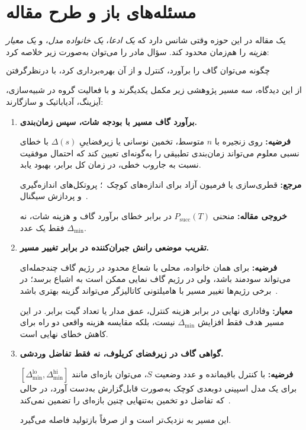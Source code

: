 \section{مسئله‌های باز و طرح مقاله}
\label{sec:gap-paper-tracks}

یک مقاله در این حوزه وقتی شانس دارد که \emph{یک ادعا}، \emph{یک خانواده مدل}، و \emph{یک معیار هزینه} را هم‌زمان محدود کند.
سؤال مادر را می‌توان به‌صورت زیر خلاصه کرد:

\begin{equation}
	\boxed{
		\text{چگونه می‌توان گاف را برآورد، کنترل و از آن بهره‌برداری کرد،
			با درنظرگرفتن محدودیت منابع کوانتومی؟}
	}
\end{equation}

از این دیدگاه، سه مسیر پژوهشی زیر مکمل یکدیگرند و با فعالیت گروه در شبیه‌سازی، آیزینگ، آدیاباتیک و  سازگارند:

\begin{enumerate}
	\item \textbf{برآورد گاف مسیر با بودجه شات، سپس زمان‌بندی.}
	
	\textbf{فرضیه:}
	روی زنجیره  با $n$ متوسط، تخمین نوسانی یا زیرفضا‌ییِ $\Delta(s)$ با خطای نسبی معلوم می‌تواند زمان‌بندی تطبیقی را به‌گونه‌ای تعیین کند که احتمال موفقیت نسبت به جاروب خطی، در زمان کل برابر، بهبود یابد.
	
	\textbf{مرجع:}
	قطری‌سازی یا فرمیون آزاد برای اندازه‌های کوچک~\cite{GapPfeuty1970}؛ پروتکل‌های اندازه‌گیری و پردازش سیگنال~\cite{GapLee2025,GapCugini2025}.
	
	\textbf{خروجی مقاله:}
	منحنی $P_{\mathrm{succ}}(T)$ در برابر خطای برآورد گاف و هزینه شات، نه فقط یک عدد $\Delta_{\min}$.
	
	\item \textbf{تقریب موضعی رانش جبران‌کننده در برابر تغییر مسیر.}
	
	\textbf{فرضیه:}
	برای همان خانواده،  محلی با شعاع محدود در رژیم گاف چندجمله‌ای می‌تواند سودمند باشد، ولی در رژیم گاف نمایی ممکن است به اشباع برسد؛ در برخی رژیم‌ها تغییر مسیر با هامیلتونی کاتالیزگر می‌تواند گزینه بهتری باشد~\cite{GapSels2017,Gueneau2025CD}.
	
	\textbf{معیار:}
	وفاداری نهایی در برابر هزینه کنترل، عمق مدار یا تعداد گیت برابر.
	در این مسیر هدف فقط افزایش $\Delta_{\min}$ نیست، بلکه مقایسه هزینه واقعی دو راه برای کاهش خطای نهایی است.
	
	\item \textbf{گواهی گاف در زیرفضای کریلوف، نه فقط تفاضل وردشی.}
	
	\textbf{فرضیه:}
	با کنترل باقیمانده و عدد وضعیت $S$، می‌توان بازه‌ای مانند
	$[\Delta_{\min}^{\mathrm{lo}},\Delta_{\min}^{\mathrm{hi}}]$
	برای یک مدل اسپینی دوبعدی کوچک به‌صورت قابل‌گزارش به‌دست آورد، در حالی که تفاضل دو تخمین  به‌تنهایی چنین بازه‌ای را تضمین نمی‌کند~\cite{Kirby2023Krylov,KrylovNatComm2025,McClean2017QSE}.
	
	این مسیر به  نزدیک‌تر است و از صرفاً بازتولید  فاصله می‌گیرد.
	
\end{enumerate}

